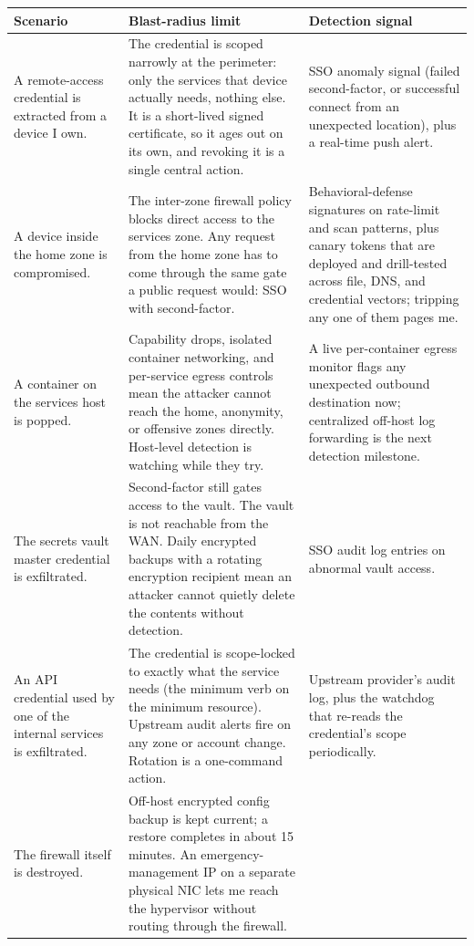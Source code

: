 \documentclass[12pt]{article}
\begin{document}
\begin{longtable}{|p{4.5cm}|p{5cm}|p{5cm}|}
\hline
\textbf{Scenario} & \textbf{Blast-radius limit} & \textbf{Detection signal} \\
\hline
A remote-access credential is extracted from a device I own. &
The credential is scoped narrowly at the perimeter: only the services that device actually needs, nothing else. It is a short-lived signed certificate, so it ages out on its own, and revoking it is a single central action. &
SSO anomaly signal (failed second-factor, or successful connect from an unexpected location), plus a real-time push alert. \\
\hline
A device inside the home zone is compromised. &
The inter-zone firewall policy blocks direct access to the services zone. Any request from the home zone has to come through the same gate a public request would: SSO with second-factor. &
Behavioral-defense signatures on rate-limit and scan patterns, plus canary tokens that are deployed and drill-tested across file, DNS, and credential vectors; tripping any one of them pages me. \\
\hline
A container on the services host is popped. &
Capability drops, isolated container networking, and per-service egress controls mean the attacker cannot reach the home, anonymity, or offensive zones directly. Host-level detection is watching while they try. &
A live per-container egress monitor flags any unexpected outbound destination now; centralized off-host log forwarding is the next detection milestone. \\
\hline
The secrets vault master credential is exfiltrated. &
Second-factor still gates access to the vault. The vault is not reachable from the WAN. Daily encrypted backups with a rotating encryption recipient mean an attacker cannot quietly delete the contents without detection. &
SSO audit log entries on abnormal vault access. \\
\hline
An API credential used by one of the internal services is exfiltrated. &
The credential is scope-locked to exactly what the service needs (the minimum verb on the minimum resource). Upstream audit alerts fire on any zone or account change. Rotation is a one-command action. &
Upstream provider's audit log, plus the watchdog that re-reads the credential's scope periodically. \\
\hline
The firewall itself is destroyed. &
Off-host encrypted config backup is kept current; a restore completes in about 15 minutes. An emergency-management IP on a separate physical NIC lets me reach the hypervisor without routing through the firewall. &

\end{longtable}
\end{document}
